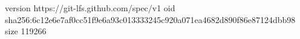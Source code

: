 version https://git-lfs.github.com/spec/v1
oid sha256:6c12e6e7af0cc51f9e6a93c013333245c920a071ea4682d890f86e87124dbb98
size 119266
